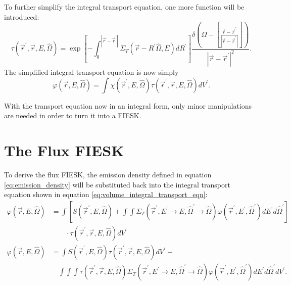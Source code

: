 To further simplify the integral transport equation, one more function will be 
introduced:
\begin{equation}
  \tau(\vec{r}^{'},\vec{r},E,\hat{\Omega}) = 
  \exp{\left[-\int_0^{|\vec{r} - \vec{r}^{'}|} 
              \Sigma_T(\vec{r}-R^{'}\hat{\Omega},E)dR^{'} \right]}
    \frac{\delta \left(\Omega - \left[\frac{\vec{r} - \vec{r}^{'}}
        {|\vec{r} - \vec{r}^{'}|}\right]\right)} 
    {|\vec{r} - \vec{r}^{'}|^2}.
  \label{eq:unnormalized_transport_kernel}
\end{equation}
The simplified integral transport equation is now simply
\begin{equation}
  \varphi(\vec{r},E,\hat{\Omega}) =
  \int \chi(\vec{r}^{'},E,\hat{\Omega})
  \tau(\vec{r}^{'},\vec{r},E,\hat{\Omega}) dV^{'}.
  \label{eq:volume_integral_transport_eqn}
\end{equation}

With the transport equation now in an integral form, only minor manipulations
are needed in order to turn it into a FIESK.

\section{The Flux FIESK}
\label{sec:flux_fiesk}
To derive the flux FIESK, the emission density defined in equation 
\ref{eq:emission_density} will be substituted back into the integral
transport equation shown in equation \ref{eq:volume_integral_transport_eqn}:
\begin{align}
  \varphi(\vec{r},E,\hat{\Omega}) & = \int \left[
    S(\vec{r}^{'},E,\hat{\Omega}) + 
    \int\int \Sigma_T(\vec{r}^{'},E^{'} \to E, \hat{\Omega}^{'} \to \hat{\Omega})
    \varphi(\vec{r}^{'},E^{'},\hat{\Omega}^{'})dE^{'}d\hat{\Omega}^{'} \right] 
  \nonumber \\
    & \qquad \cdot \tau(\vec{r}^{'},\vec{r},E,\hat{\Omega}) dV^{'}
  \nonumber \\
  \varphi(\vec{r},E,\hat{\Omega}) & =\int S(\vec{r}^{'},E,\hat{\Omega})
  \tau(\vec{r}^{'},\vec{r},E,\hat{\Omega}) dV^{'} + \nonumber \\
  & \quad \int\int\int \tau(\vec{r}^{'},\vec{r},E,\hat{\Omega})
  \Sigma_T(\vec{r}^{'},E^{'} \to E, \hat{\Omega}^{'} \to \hat{\Omega})
  \varphi(\vec{r}^{'},E^{'},\hat{\Omega}^{'}) dE^{'} d\hat{\Omega}^{'} dV^{'}.
  \label{eq:flux_integral_equation}
\end{align}

